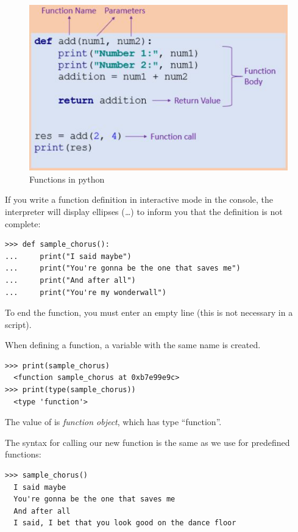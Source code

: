 \begin{figure}[t]
    \centering
    \includegraphics[width=\0.75\textwidth]{images/funciones_partes-eng.png}
    \caption{Functions in python}
    \label{fig:partes_funciones}
\end{figure}


If you write a function definition in interactive mode in the console, the interpreter will display ellipses (\emph{\ldots{}}) to inform you that the definition is not complete:

\begin{Verbatim}[frame=single]
>>> def sample_chorus():
...     print("I said maybe")
...     print("You're gonna be the one that saves me")
...     print("And after all")
...     print("You're my wonderwall")
\end{Verbatim}

To end the function, you must enter an empty line (this is not necessary in a script).

When defining a function, a variable with the same name is created.

\begin{Verbatim}[frame=single]
>>> print(sample_chorus)
  <function sample_chorus at 0xb7e99e9c>
>>> print(type(sample_chorus))
  <type 'function'>
\end{Verbatim}

The value of  is \emph{function object}, which has type ``function''.

 

The syntax for calling our new function is the same as we use for predefined functions:

\begin{Verbatim}[frame=single]
>>> sample_chorus()
  I said maybe
  You're gonna be the one that saves me
  And after all
  I said, I bet that you look good on the dance floor
\end{Verbatim}

